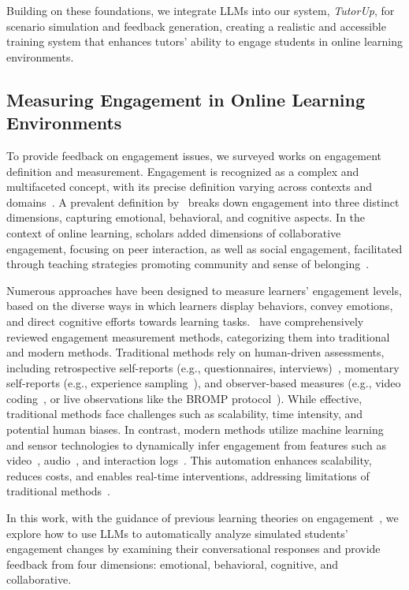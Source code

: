 Building on these foundations, we integrate LLMs into our system, \textit{TutorUp}, for scenario simulation and feedback generation, creating a realistic and accessible training system that enhances tutors' ability to engage students in online learning environments.

\subsection{Measuring Engagement in Online Learning Environments}
\label{subsec:engagement}

To provide feedback on engagement issues, we surveyed works on engagement definition and measurement. Engagement is recognized as a complex and multifaceted concept, with its precise definition varying across contexts and domains~\cite{Hagerup1993, joshi2022behavioral, redmond2018online,fredricks2004school}. A prevalent definition by~\citet{fredricks2004school} breaks down engagement into three distinct dimensions, capturing emotional, behavioral, and cognitive aspects. In the context of online learning, scholars added dimensions of collaborative engagement, focusing on peer interaction, as well as social engagement, facilitated through teaching strategies promoting community and sense of belonging~\cite{joshi2022behavioral,redmond2018online}. 

Numerous approaches have been designed to measure learners' engagement levels, based on the diverse ways in which learners display behaviors, convey emotions, and direct cognitive efforts towards learning tasks.~\citet{booth2023engagement} have comprehensively reviewed engagement measurement methods, categorizing them into traditional and modern methods. Traditional methods rely on human-driven assessments, including retrospective self-reports (e.g., questionnaires, interviews)~\cite{turner2000studying,gorin2001recall}, momentary self-reports (e.g., experience sampling~\cite{csikszentmihalyi1987validity, hutt2019time}), and observer-based measures (e.g., video coding~\cite{zaletelj2017predicting,yun2018automatic,sumer2021multimodal}, or live observations like the BROMP protocol~\cite{ocumpaugh2015baker}). While effective, traditional methods face challenges such as scalability, time intensity, and potential human biases. In contrast, modern methods utilize machine learning and sensor technologies to dynamically infer engagement from features such as video~\cite{bidwell2011classroom,dhall2018emotiw}, audio~\cite{dhall2018emotiw}, and interaction logs~\cite{grawemeyer2017affective,dewan2019engagement}. This automation enhances scalability, reduces costs, and enables real-time interventions, addressing limitations of traditional methods~\cite{booth2023engagement}.

In this work, with the guidance of previous learning theories on engagement~\cite{fredricks2004school, joshi2022behavioral}, we explore how to use LLMs to automatically analyze simulated students' engagement changes by examining their conversational responses and provide feedback from four dimensions: emotional, behavioral, cognitive, and collaborative.